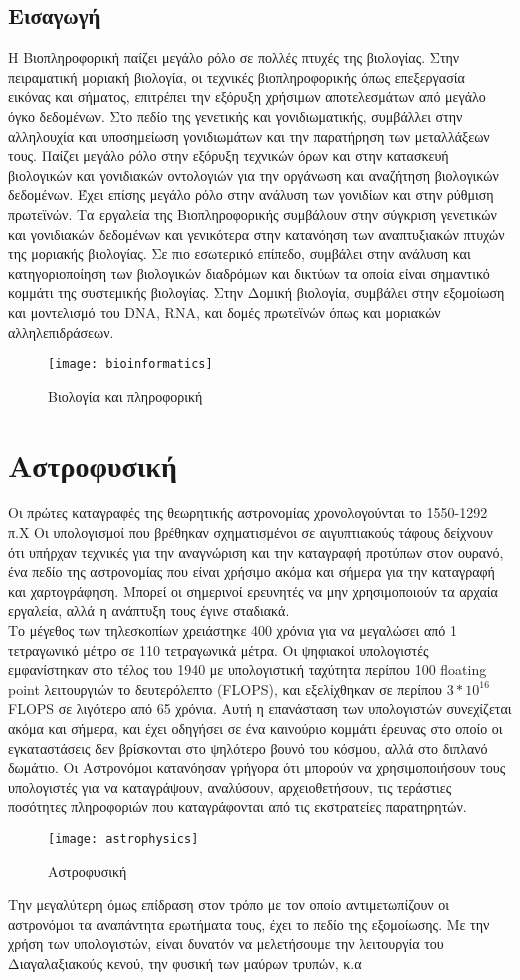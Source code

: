 \subsection{Εισαγωγή}
Η Βιοπληροφορική παίζει μεγάλο ρόλο σε πολλές πτυχές της βιολογίας. Στην πειραματική μοριακή βιολογία, οι τεχνικές βιοπληροφορικής όπως επεξεργασία εικόνας και σήματος, επιτρέπει την εξόρυξη χρήσιμων αποτελεσμάτων από μεγάλο όγκο δεδομένων. Στο πεδίο της γενετικής και γονιδιωματικής, συμβάλλει στην αλληλουχία και υποσημείωση γονιδιωμάτων και την παρατήρηση των μεταλλάξεων τους. Παίζει μεγάλο ρόλο στην εξόρυξη τεχνικών όρων και στην κατασκευή βιολογικών και γονιδιακών οντολογιών για την οργάνωση και αναζήτηση βιολογικών δεδομένων. Έχει επίσης μεγάλο ρόλο στην ανάλυση των γονιδίων και στην ρύθμιση πρωτεϊνών. Τα εργαλεία της Βιοπληροφορικής συμβάλουν στην σύγκριση γενετικών και γονιδιακών δεδομένων και γενικότερα στην κατανόηση των αναπτυξιακών πτυχών της μοριακής βιολογίας. Σε πιο εσωτερικό επίπεδο, συμβάλει στην ανάλυση και κατηγοριοποίηση των βιολογικών διαδρόμων και δικτύων τα οποία είναι σημαντικό κομμάτι της συστεμικής βιολογίας. Στην Δομική βιολογία, συμβάλει στην εξομοίωση και μοντελισμό του DNA, RNA, και δομές πρωτεϊνών όπως και μοριακών αλληλεπιδράσεων.
\begin{figure}[h]
\centering
\texttt{[image: bioinformatics]}
\caption{Βιολογία και πληροφορική}
\end{figure}
\section{Αστροφυσική}
Οι πρώτες καταγραφές της θεωρητικής αστρονομίας χρονολογούνται το 1550-1292 π.Χ Οι υπολογισμοί που βρέθηκαν σχηματισμένοι σε αιγυπτιακούς τάφους δείχνουν ότι υπήρχαν τεχνικές για την αναγνώριση και την καταγραφή προτύπων στον ουρανό, ένα πεδίο της αστρονομίας που είναι χρήσιμο ακόμα και σήμερα για την καταγραφή και χαρτογράφηση. Μπορεί οι σημερινοί ερευνητές να μην χρησιμοποιούν τα αρχαία εργαλεία, αλλά η ανάπτυξη τους έγινε σταδιακά. \\
Το μέγεθος των τηλεσκοπίων χρειάστηκε 400 χρόνια για να μεγαλώσει από 1 τετραγωνικό μέτρο σε 110 τετραγωνικά μέτρα. Οι ψηφιακοί υπολογιστές εμφανίστηκαν στο τέλος του 1940 με υπολογιστική ταχύτητα περίπου 100 floating point λειτουργιών το δευτερόλεπτο (FLOPS), και εξελίχθηκαν σε περίπου $3*10^{16}$ FLOPS σε λιγότερο από 65 χρόνια. Αυτή η επανάσταση των υπολογιστών συνεχίζεται ακόμα και σήμερα, και έχει οδηγήσει σε ένα καινούριο κομμάτι έρευνας στο οποίο οι εγκαταστάσεις δεν βρίσκονται στο ψηλότερο βουνό του κόσμου, αλλά στο διπλανό δωμάτιο. Οι Αστρονόμοι κατανόησαν γρήγορα ότι μπορούν να χρησιμοποιήσουν τους υπολογιστές για να καταγράψουν, αναλύσουν, αρχειοθετήσουν, τις τεράστιες ποσότητες πληροφοριών που καταγράφονται από τις εκστρατείες παρατηρητών. \\
\begin{figure}[h]
\centering
\texttt{[image: astrophysics]}
\caption{Αστροφυσική}
\end{figure}
Την μεγαλύτερη όμως επίδραση στον τρόπο με τον οποίο αντιμετωπίζουν οι αστρονόμοι τα αναπάντητα ερωτήματα τους, έχει το πεδίο της εξομοίωσης. Με την χρήση των υπολογιστών, είναι δυνατόν να μελετήσουμε την λειτουργία του Διαγαλαξιακούς κενού, την φυσική των μαύρων τρυπών, κ.α